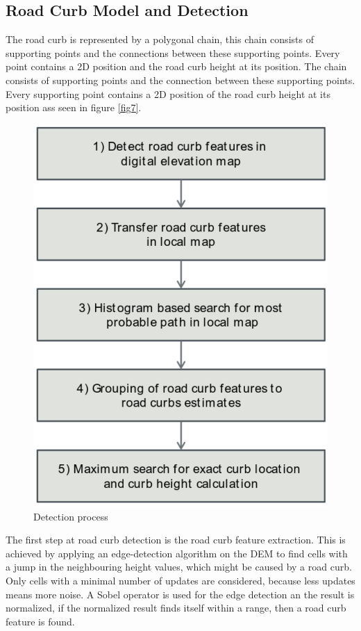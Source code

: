 \subsection{Road Curb Model and Detection}

The road curb is represented by a polygonal chain, this chain consists of supporting points and the connections between these supporting points. Every point contains a 2D position and the road curb height at its position. The chain consists of supporting points and the connection between these supporting points. Every supporting point contains a 2D position of the road curb height at its position ass seen in figure \ref{fig7}. 


\begin{figure}[ht]
	\centering
  	\includegraphics[scale = 0.5]{pictures/detection_process.pdf}
	\caption{Detection process}
	\label{fig8}
\end{figure}



The first step at road curb detection is the road curb feature extraction. This is achieved by applying an edge-detection algorithm on the DEM to find cells with a jump in the neighbouring height values, which might be caused by a road curb. Only cells with a minimal number of updates are considered, because less updates means more noise. A Sobel operator is used for the edge detection an the result is normalized, if the normalized result finds itself within a range, then a road curb feature is found. 



